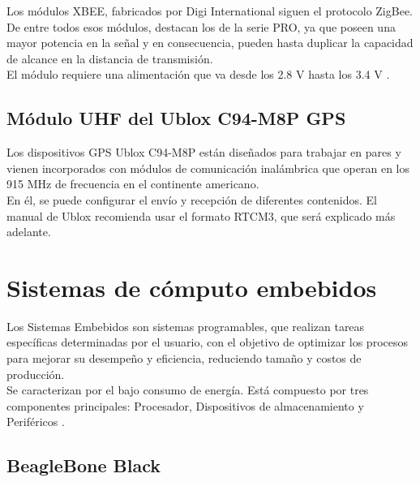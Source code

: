 Los módulos XBEE, fabricados por Digi International siguen el protocolo ZigBee. De entre todos esos módulos, destacan los de la serie PRO, ya que poseen una mayor potencia en la señal y en consecuencia, pueden hasta duplicar la capacidad de alcance en la distancia de transmisión. \\

El módulo requiere una alimentación que va desde los 2.8 V hasta los 3.4 V \cite{oyarce2010guia}.

\subsection{Módulo UHF del Ublox C94-M8P GPS}

Los dispositivos GPS Ublox C94-M8P están diseñados para trabajar en pares y vienen incorporados con módulos de comunicación inalámbrica que operan en los 915 MHz de frecuencia en el continente americano. \\

En él, se puede configurar el envío y recepción de diferentes contenidos. El manual de Ublox recomienda usar el formato RTCM3, que será explicado más adelante.

\section{Sistemas de cómputo embebidos}

Los Sistemas Embebidos son sistemas programables, que realizan tareas específicas determinadas por el usuario, con el objetivo de optimizar los procesos para mejorar su desempeño y eficiencia, reduciendo tamaño y costos de producción. \\

Se caracterizan por el bajo consumo de energía. Está compuesto por tres componentes principales: Procesador, Dispositivos de almacenamiento y Periféricos \cite{caballero2014desarrollo}.

\subsection{BeagleBone Black}

